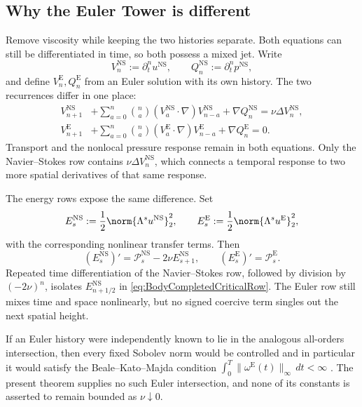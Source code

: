 \subsection{Why the Euler Tower is different}\label{sub:WhyTheEulerTowerIsDifferent}

Remove viscosity while keeping the two histories separate.  Both equations can
still be differentiated in time, so both possess a mixed jet.  Write
\[
  V_n^{\mathrm{NS}}:=\partial_t^nu^{\mathrm{NS}},
  \qquad
  Q_n^{\mathrm{NS}}:=\partial_t^np^{\mathrm{NS}},
\]
and define \(V_n^{\mathrm E},Q_n^{\mathrm E}\) from an Euler solution with its
own history.  The two recurrences differ in one place:
\begin{align}
  V_{n+1}^{\mathrm{NS}}
  &+
  \sum_{a=0}^{n}\binom{n}{a}
  (V_a^{\mathrm{NS}}\cdot\nabla)V_{n-a}^{\mathrm{NS}}
  +\nabla Q_n^{\mathrm{NS}}
  =\nu\Delta V_n^{\mathrm{NS}},
  \label{eq:NSTemporalRecurrenceComparison}
  \\
  V_{n+1}^{\mathrm E}
  &+
  \sum_{a=0}^{n}\binom{n}{a}
  (V_a^{\mathrm E}\cdot\nabla)V_{n-a}^{\mathrm E}
  +\nabla Q_n^{\mathrm E}
  =0.
  \label{eq:EulerTemporalRecurrenceComparison}
\end{align}
Transport and the nonlocal pressure response remain in both equations.
Only the Navier--Stokes row contains \(\nu\Delta V_n^{\mathrm{NS}}\), which
connects a temporal response to two more spatial derivatives of that same
response.

The energy rows expose the same difference.  Set
\[
  E_s^{\mathrm{NS}}:=\frac12\norm{\Lambda^su^{\mathrm{NS}}}_2^2,
  \qquad
  E_s^{\mathrm E}:=\frac12\norm{\Lambda^su^{\mathrm E}}_2^2,
\]
with the corresponding nonlinear transfer terms.  Then
\begin{equation}\label{eq:NSEulerEnergyComparison}
  (E_s^{\mathrm{NS}})'
  =\mathcal P_s^{\mathrm{NS}}-2\nu E_{s+1}^{\mathrm{NS}},
  \qquad
  (E_s^{\mathrm E})'
  =\mathcal P_s^{\mathrm E}.
\end{equation}
Repeated time differentiation of the Navier--Stokes row, followed by division
by \((-2\nu)^n\), isolates \(E_{n+1/2}^{\mathrm{NS}}\) in
\eqref{eq:BodyCompletedCriticalRow}.  The Euler row still mixes time and space
nonlinearly, but no signed coercive term singles out the next spatial height.

If an Euler history were independently known to lie in the analogous
all-orders intersection, then every fixed Sobolev norm would be controlled and
in particular it would satisfy the Beale--Kato--Majda condition
\(\int_0^T\|\omega^{\mathrm E}(t)\|_\infty\,dt<\infty\)
\parencite{BealeKatoMajda1984}.  The present theorem supplies no such Euler
intersection, and none of its constants is asserted to remain bounded as
\(\nu\downarrow0\).

